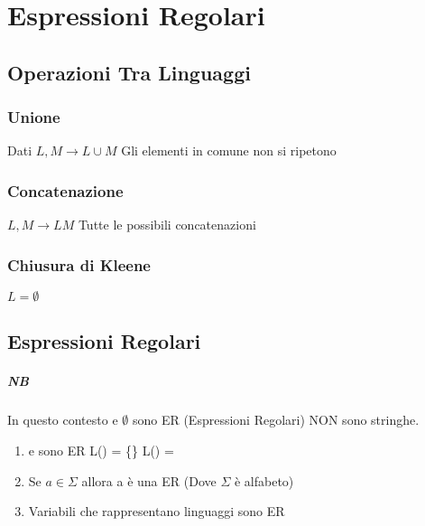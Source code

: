 \chapter{Espressioni Regolari}
\section{Operazioni Tra Linguaggi}
\subsection*{Unione}
Dati $L,M \rightarrow L \cup M$
Gli elementi in comune non si ripetono
\subsection*{Concatenazione} $L,M \rightarrow LM$
Tutte le possibili concatenazioni
\subsection*{Chiusura di Kleene} $L = \emptyset$
\section*{Espressioni Regolari}
\paragraph*{NB} In questo contesto \eps e $\emptyset$ sono ER (Espressioni
Regolari) NON sono stringhe.
\begin{enumerate}
    \item \eps e \empt sono ER \ra L(\eps) = \{\eps\} L(\empt) = \empt
    \item Se $a \in \Sigma$ allora a è una ER (Dove $\Sigma$ è alfabeto)
    \item Variabili che rappresentano linguaggi sono ER
\end{enumerate}
